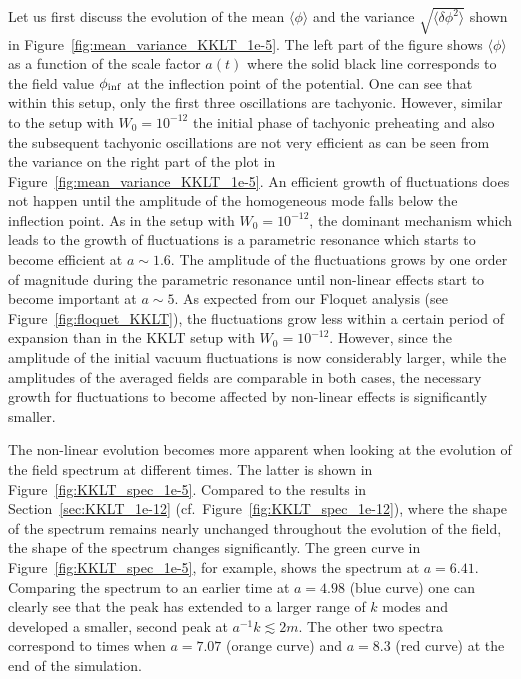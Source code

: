 \documentclass[12pt]{article}
\begin{document}
Let us first discuss the evolution of the mean $\langle\phi\rangle$ and the variance $\sqrt{\langle\delta\phi^2\rangle}$ shown in Figure~\ref{fig:mean_variance_KKLT_1e-5}. The left part of the figure shows $\langle\phi\rangle$ as a function of the scale factor $a(t)$ where the solid black line corresponds to the field value $\phi_{\rm inf}$ at the inflection point of the potential. One can see that within this setup, only the first three oscillations are tachyonic. However, similar to the setup with $W_0=10^{-12}$ the initial phase of tachyonic preheating and also the subsequent tachyonic oscillations are not very efficient as can be seen from the variance on the right part of the plot in Figure~\ref{fig:mean_variance_KKLT_1e-5}. An efficient growth of fluctuations does not happen until the amplitude of the homogeneous mode falls below the inflection point. As in the setup with $W_0=10^{-12}$, the dominant mechanism which leads to the growth of fluctuations is a parametric resonance which starts to become efficient at $a\sim1.6$. The amplitude of the fluctuations grows by one order of magnitude during the parametric resonance until non-linear effects start to become important at $a\sim5$. As expected from our Floquet analysis (see Figure~\ref{fig:floquet_KKLT}), the fluctuations grow less within a certain period of expansion than in the KKLT setup with $W_0=10^{-12}$. However, since the amplitude of the initial vacuum fluctuations is now considerably larger, while the amplitudes of the averaged fields are comparable in both cases, the necessary growth for fluctuations to become affected by non-linear effects is significantly smaller. 

The non-linear evolution becomes more apparent when looking at the evolution of the field spectrum at different times. The latter is shown in Figure~\ref{fig:KKLT_spec_1e-5}. Compared to the results in Section~\ref{sec:KKLT_1e-12} (cf.\ Figure~\ref{fig:KKLT_spec_1e-12}), where the shape of the spectrum remains nearly unchanged throughout the evolution of the field, the shape of the spectrum changes significantly. The green curve in Figure~\ref{fig:KKLT_spec_1e-5}, for example, shows the spectrum at $a=6.41$. Comparing the spectrum to an earlier time at $a=4.98$ (blue curve) one can clearly see that the peak has extended to a larger range of $k$ modes and developed a smaller, second peak at $a^{-1}k \lesssim2 m$. The other two spectra correspond to times when $a=7.07$ (orange curve) and $a=8.3$ (red curve) at the end of the simulation.
\end{document}

